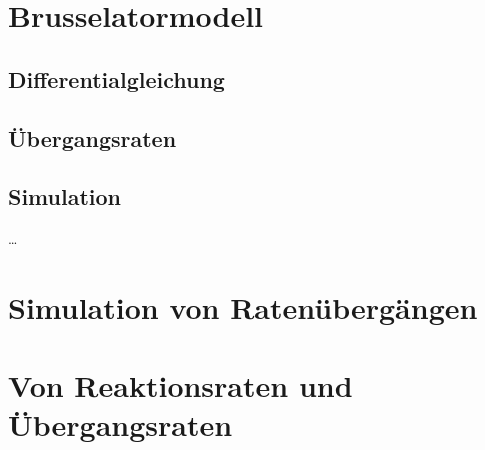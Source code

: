 \documentclass{scrartcl}
\begin{document}
\section{Brusselatormodell}
\subsection{Differentialgleichung}
\subsection{Übergangsraten}
\subsection{Simulation}
\dots 
\section{Simulation von Ratenübergängen}
\section{Von Reaktionsraten und Übergangsraten}
\end{document}
